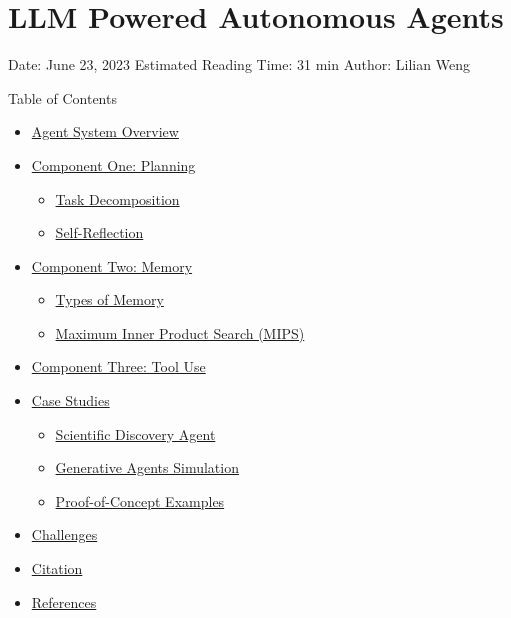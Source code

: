\section{LLM Powered Autonomous Agents}\label{llm-powered-autonomous-agents}

Date: June 23, 2023 \textbar{} Estimated Reading Time: 31 min \textbar{} Author: Lilian Weng

{Table of Contents}

\begin{itemize}
\tightlist
\item
  \hyperref[agent-system-overview]{Agent System Overview}
\item
  \hyperref[component-one-planning]{Component One: Planning}

  \begin{itemize}
  \tightlist
  \item
    \hyperref[task-decomposition]{Task Decomposition}
  \item
    \hyperref[self-reflection]{Self-Reflection}
  \end{itemize}
\item
  \hyperref[component-two-memory]{Component Two: Memory}

  \begin{itemize}
  \tightlist
  \item
    \hyperref[types-of-memory]{Types of Memory}
  \item
    \hyperref[maximum-inner-product-search-mips]{Maximum Inner Product Search (MIPS)}
  \end{itemize}
\item
  \hyperref[component-three-tool-use]{Component Three: Tool Use}
\item
  \hyperref[case-studies]{Case Studies}

  \begin{itemize}
  \tightlist
  \item
    \hyperref[scientific-discovery-agent]{Scientific Discovery Agent}
  \item
    \hyperref[generative-agents-simulation]{Generative Agents Simulation}
  \item
    \hyperref[proof-of-concept-examples]{Proof-of-Concept Examples}
  \end{itemize}
\item
  \hyperref[challenges]{Challenges}
\item
  \hyperref[citation]{Citation}
\item
  \hyperref[references]{References}
\end{itemize}


